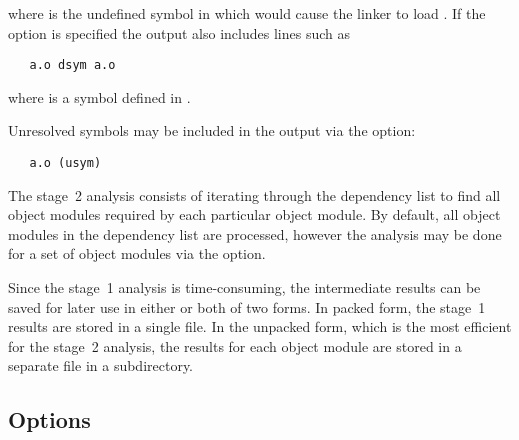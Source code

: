 \noindent
where  is the undefined symbol in  which would cause the
linker to load .  If the  option is specified the output
also includes lines such as

\begin{verbatim}
   a.o dsym a.o
\end{verbatim}

\noindent
where  is a symbol defined in .

Unresolved symbols may be included in the output via the  option:

\begin{verbatim}
   a.o (usym)
\end{verbatim}

\noindent
The stage~2 analysis consists of iterating through the dependency list to find
all object modules required by each particular object module.  By default, all
object modules in the dependency list are processed, however the analysis may
be done for a set of object modules via the  option.

Since the stage~1 analysis is time-consuming, the intermediate results can be
saved for later use in either or both of two forms.  In packed form, the
stage~1 results are stored in a single file.  In the unpacked form, which is
the most efficient for the stage~2 analysis, the results for each object
module are stored in a separate file in a subdirectory.

\subsection*{Options}


